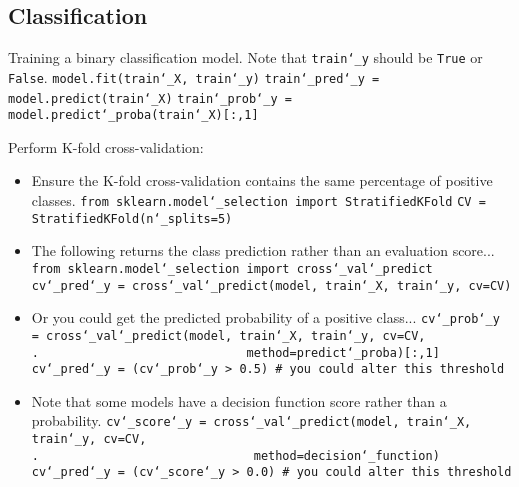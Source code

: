 \subsection{Classification}

Training a binary classification model.
Note that \texttt{train\char`_y} should be \texttt{True} or \texttt{False}.\newline
\texttt{model.fit(train\char`_X, train\char`_y)}\newline
\texttt{train\char`_pred\char`_y = model.predict(train\char`_X)}\newline
\texttt{train\char`_prob\char`_y = model.predict\char`_proba(train\char`_X)[:,1]}\newline

Perform K-fold cross-validation:
\vspace{-3.0mm}
\begin{itemize}
\item
Ensure the K-fold cross-validation contains the same percentage of positive classes.\newline
\texttt{from sklearn.model\char`_selection import StratifiedKFold}\newline
\texttt{CV = StratifiedKFold(n\char`_splits=5)}\newline

\item
The following returns the class prediction rather than an evaluation score...\newline
\texttt{from sklearn.model\char`_selection import cross\char`_val\char`_predict}\newline
\texttt{cv\char`_pred\char`_y = cross\char`_val\char`_predict(model, train\char`_X, train\char`_y, cv=CV)}\newline

\item
Or you could get the predicted probability of a positive class...\newline
\texttt{cv\char`_prob\char`_y = cross\char`_val\char`_predict(model, train\char`_X, train\char`_y, cv=CV,\newline
.~~~~~~~~~~~~~~~~~~~~~~~~~~~~~method=\textquotesingle predict\char`_proba\textquotesingle)[:,1]}\newline
\texttt{cv\char`_pred\char`_y = (cv\char`_prob\char`_y > 0.5) \# you could alter this threshold}\newline

\item
Note that some models have a decision function score rather than a probability.\newline
\texttt{cv\char`_score\char`_y = cross\char`_val\char`_predict(model, train\char`_X, train\char`_y, cv=CV,\newline
.~~~~~~~~~~~~~~~~~~~~~~~~~~~~~~method=\textquotesingle decision\char`_function\textquotesingle)}\newline
\texttt{cv\char`_pred\char`_y = (cv\char`_score\char`_y > 0.0) \# you could alter this threshold}

\end{itemize}

